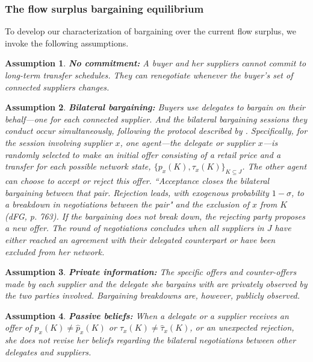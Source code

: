 \documentclass[12pt]{article} \usepackage{amsmath,amssymb,amsthm,geometry,graphicx,setspace,algorithm,algpseudocode,float}
\newtheorem{assumption}{Assumption}
\begin{document}
\subsubsection{The flow surplus bargaining equilibrium}
To develop our characterization of bargaining over the current flow surplus, we invoke the following
assumptions.
\par
\linespread{1.0} 
\begin{assumption}
\textbf{No commitment:} A buyer and her suppliers cannot commit to long-term transfer schedules. They can renegotiate whenever the buyer's set of connected suppliers changes. 
\label{ass_bargain_1}
\end{assumption}
\begin{assumption}
\textbf{Bilateral bargaining:} Buyers use delegates to bargain on their behalf---one for each connected supplier. And the bilateral bargaining sessions they conduct occur simultaneously, following the protocol described by \citet{Binmore_etal1986}. Specifically, for the session involving supplier $x$, one agent---the delegate or supplier $x$---is randomly selected to make an initial offer consisting of a retail price and a transfer for each possible network state, $\{p_{x}(K),\tau _{x}(K)\}_{K\subseteq J}$. The other agent can choose to accept or reject this offer. ``Acceptance closes the bilateral bargaining between that pair. Rejection leads, with exogenous probability $1-\sigma $, to a breakdown in negotiations between the pair" and the exclusion of $x$ from $K$ (dFG, p. 763). If the bargaining does not break down, the rejecting party proposes a new offer. The round of negotiations concludes when all suppliers in $J$ have either reached an agreement with their delegated counterpart or have been excluded from her network.
\label{ass_bargain_2}
\end{assumption}
\begin{assumption}
\textbf{Private information:} The specific offers and counter-offers made by each supplier and the delegate she bargains with are privately observed by the two parties involved. Bargaining breakdowns are, however, publicly observed.
\label{ass_bargain_3}
\end{assumption}
\begin{assumption}
\textbf{Passive beliefs: }When a delegate or a supplier receives an offer of $p_{x}(K)\neq \hat{p}_{x}(K)$ or $\tau _{x}(K)\neq \hat{\tau}_{x}(K)$, or an unexpected rejection, she does not revise her beliefs regarding the bilateral negotiations between other delegates and suppliers.
\label{ass_bargain_4}
\bigskip
\end{assumption}
\linespread{1.5} 
\end{document}

